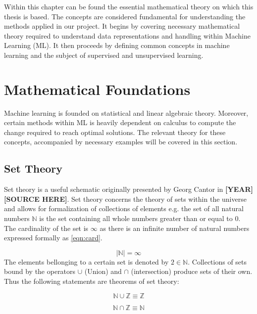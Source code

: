 Within this chapter can be found the essential mathematical theory on which this thesis is based. The concepts are considered fundamental for understanding the methods applied in our project. It begins by 
covering necessary mathematical theory required to understand data representations and handling within Machine Learning (ML). It then proceeds by defining common concepts in machine learning and the subject of supervised and unsupervised learning.


\section{Mathematical Foundations}

Machine learning is founded on statistical and linear algebraic theory. Moreover, certain methods within ML is heavily dependent on calculus to compute the change required to reach optimal solutions. The relevant theory for these concepts, accompanied by necessary examples will be covered in this section.

\subsection{Set Theory}

Set theory is a useful schematic originally presented by Georg Cantor in \textbf{[YEAR] [SOURCE HERE]}. Set theory concerns the theory of sets within the universe and allows for formalization of collections of elements e.g. the set of all natural numbers $\mathbb{N}$ is the set containing all whole numbers greater than or equal to 0. The cardinality of the set is $\infty$ as there is an infinite number of natural numbers expressed formally as \ref{eqn:card}.

\begin{equation}
\label{eqn:card}
|\mathbb{N}| = \infty
\end{equation}
The elements bellonging to a certain set is denoted by $2 \in \mathbb{N}$. 
Collections of sets bound by the operators $\cup$ (Union) and $\cap$ (intersection) produce sets of their own. Thus the following statements are theorems of set theory:


\begin{equation}
\label{eqn:union}
\mathbb{N} \cup \mathbb{Z} \equiv \mathbb{Z}
\end{equation}

\begin{equation}
\label{eqn:intersection}
\mathbb{N} \cap \mathbb{Z} \equiv \mathbb{N}
\end{equation}

